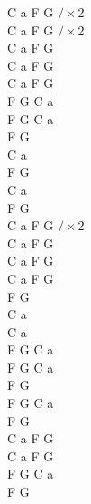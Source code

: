 \documentclass[a5paper, 10pt]{book}
\begin{document}
\begin{minipage}[t]{0.18\textwidth}
  C a F G $/\times$2\\
  C a F G $/\times$2\\

  C a F G\\

  C a F G\\
  C a F G\\

  F G C a\\
  F G C a\\

  F G\\
  C a\\
  F G\\
  C a\\
  F G\\

  C a F G $/\times$2\\
  C a F G\\

  C a F G\\
  C a F G\\

  F G\\
  C a\\

  C a \\
  F G C a\\
  F G C a\\
  F G \\

  F G C a\\
  F G\\

  C a F G\\
  C a F G\\

  F G C a\\
  F G\\
\end{minipage}
\end{document}
